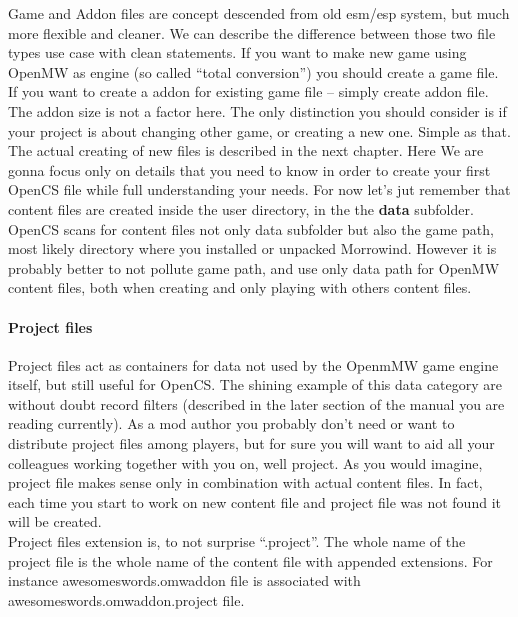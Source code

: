 Game and Addon files are concept descended from old esm/esp system, but much more flexible and cleaner. We can describe the difference between those two file types use case with clean statements. If you want to make new game using Open{MW} as engine (so called ``total conversion'') you should create a game file. If you want to create a addon for existing game file -- simply create addon file. The addon size is not a factor here. The only distinction you should consider is if your project is about changing other game, or creating a new one. Simple as that.\\


The actual creating of new files is described in the next chapter. Here We are gonna focus only on details that you need to know in order to create your first Open{CS} file while full understanding your needs. For now let's jut remember that content files are created inside the user directory, in the the \textbf{data} subfolder. Open{CS} scans for content files not only data subfolder but also the game path, most likely directory where you installed or unpacked Morrowind\texttrademark. However it is probably better to not pollute game path, and use only data path for Open{MW} content files, both when creating and only playing with others content files.\\

\paragraph{Project files}
Project files act as containers for data not used by the Openm{MW} game engine itself, but still useful for OpenCS. The shining example of this data category are without doubt record filters (described in the later section of the manual you are reading currently). As a mod author you probably don't need or want to distribute project files among players, but for sure you will want to aid all your colleagues working together with you on, well project. As you would imagine, project file makes sense only in combination with actual content files. In fact, each time you start to work on new content file and project file was not found it will be created.\\ 
Project files extension is, to not surprise ``.project''. The whole name of the project file is the whole name of the content file with appended extensions. For instance awesomeswords.omwaddon file is associated with awesomeswords.omwaddon.project file.\\

